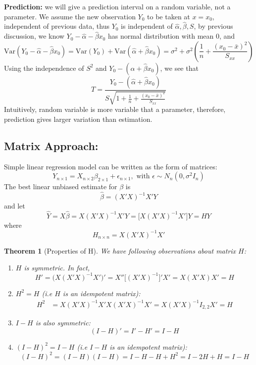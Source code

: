 \documentclass[11pt]{article}
\newtheorem{thm}{Theorem}[subsection]
\begin{document}
\textbf{Prediction:  } we will give a prediction interval on a random variable, not a parameter. We assume the new observation $Y_0$ to be taken at $x = x_0$, independent of previous data, thus $Y_0$ is independent of $\hat{\alpha}, \hat{\beta}, S$, by previous discussion, we know $Y_0 - \hat{\alpha} - \hat{\beta } x_0$ has normal distribution with mean 0, and 
$$\text{Var}(Y_0 - \hat{\alpha} - \hat{\beta} x_0) = \text{Var}(Y_0) + \text{Var}(\hat{\alpha} + \hat{\beta}x_0) = \sigma^2 + \sigma^2 \left( \dfrac{1}{n} + \dfrac{(x_0 - \bar{x})^2}{S_{xx}}\right) $$
Using the independence of $S^2$ and $Y_0 - (\hat{\alpha} + \hat{\beta} x_0)$, we see that
$$T = \dfrac{Y_0 - (\hat{\alpha} + \hat{\beta} x_0)}{S\sqrt{1 + \frac{1}{n} + \frac{(x_0 - \bar{x})^2}{S_{xx}}}} $$
Intuitively, random variable is more variable that a parameter, therefore, prediction gives larger variation than estimation. 

\subsection{Matrix Approach: }
	Simple linear regression model can be written as the form of matrices:
	$$Y_{n \times 1} = X_{n \times 2}\beta_{2 \times 1} + \epsilon_{n \times 1}, \text{ with } \epsilon \sim N_{n} \left(0, \sigma^2 I_n\right) $$
The best linear unbiased estimate for $\beta$ is 
\begin{equation}\label{eq: beta-matrix}
	\hat{\beta } = (X'X)^{-1} X' Y
\end{equation}
and let 
\begin{equation}\label{eq: y_hat-matrix}
	\hat{Y} = X \hat{\beta} =  X  (X'X)^{-1} X' Y = \big[X(X'X)^{-1} X' \big] Y = H  Y
\end{equation}
where
\begin{equation}\label{eq: H}
	H_{n \times n } = X(X'X)^{-1} X'
\end{equation}
\begin{thm}[Properties of H]
	We have following observations about matrix $H$:
	\begin{enumerate}
		\item $H$ is symmetric. In fact,
		$$H' = \big(X(X'X)^{-1} X' \big)' = X'' \big[(X'X)^{-1}\big]'X' = X(X'X)X' = H $$
		\item $H^2 = H $ (i.e $H$ is an idempotent matrix):
		\begin{align*}
			H^2 & = X(X'X)^{-1} X' X(X'X)^{-1} X' = X (X'X)^{-1}  I_{2, 2}X' = H
		\end{align*}
	\item $I - H$ is also symmetric:
	 $$(I - H)' = I' - H' = I - H $$
	 \item $(I - H)^2 = I - H$ (i.e $I - H$ is an idempotent matrix):
	 $$(I - H)^2 = (I - H)(I - H) = I - H - H + H^2 = I - 2H + H = I -H $$
	\end{enumerate}
\end{thm}
\end{document}
